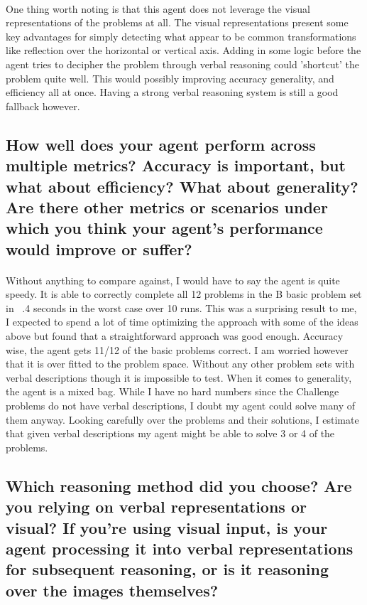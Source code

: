 \documentclass[12pt]{article}
\begin{document}
\paragraph{}
One thing worth noting is that this agent does not leverage the visual representations of the problems at all. The visual representations present some key advantages for simply detecting what appear to be common transformations like reflection over the horizontal or vertical axis. Adding in some logic before the agent tries to decipher the problem through verbal reasoning could 'shortcut' the problem quite well. This would possibly improving accuracy generality, and efficiency all at once. Having a strong verbal reasoning system is still a good fallback however. 

\subsection{How well does your agent perform across multiple metrics? Accuracy is important, but what about efficiency? What about generality? Are there other metrics or scenarios under which you think your agent’s performance would improve or suffer?}
\paragraph{}
Without anything to compare against, I would have to say the agent is quite speedy. It is able to correctly complete all 12 problems in the B basic problem set in ~.4 seconds in the worst case over 10 runs. This was a surprising result to me, I expected to spend a lot of time optimizing the approach with some of the ideas above but found that a straightforward approach was good enough. Accuracy wise, the agent gets 11/12 of the basic problems correct. I am worried however that it is over fitted to the problem space. Without any other problem sets with verbal descriptions though it is impossible to test. When it comes to generality, the agent is a mixed bag. While I have no hard numbers since the Challenge problems do not have verbal descriptions, I doubt my agent could solve many of them anyway. Looking carefully over the problems and their solutions, I estimate that given verbal descriptions my agent might be able to solve 3 or 4 of the problems.

\subsection{Which reasoning method did you choose? Are you relying on verbal representations or visual? If you’re using visual input, is your agent processing it into verbal representations for subsequent reasoning, or is it reasoning over the images themselves?}
\end{document}
